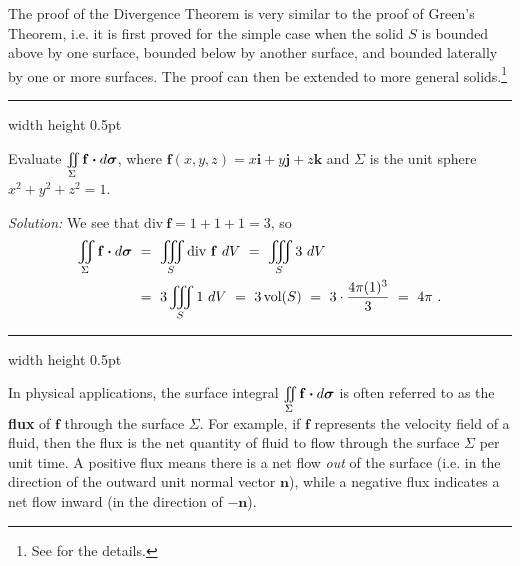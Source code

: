 
The proof of the Divergence Theorem is very similar to the proof of Green's Theorem, i.e. it is first proved for
the simple case when the solid $S$ is bounded above by one surface, bounded below by another surface, and bounded
laterally by one or more surfaces. The proof can then be extended to more general solids.\footnote{See
\cite[\S\,15.6]{tm} for the details.}

\medskip
\hrule width \textwidth height 0.5pt
\begin{exmp}
 Evaluate $\iint\limits_{\Sigma} \mathbf{f} \bm{\cdot} d\bm{\sigma}$, where $\mathbf{f}(x,y,z) = x\mathbf{i} +
  y\mathbf{j} + z\mathbf{k}$ and $\Sigma$ is the unit sphere $x^2 + y^2 + z^2 = 1$.\smallskip
 \par\noindent \emph{Solution:} We see that $\text{div}~\mathbf{f} = 1+1+1=3$, so
 \begin{align*}
  \iint\limits_{\Sigma} \mathbf{f} \bm{\cdot} d\bm{\sigma} ~&=~
  \iiint\limits_{S} \text{div}~\mathbf{f} ~dV
  ~=~ \iiint\limits_{S} 3 ~dV\\
  &=~ 3 \iiint\limits_{S} 1 ~dV
  ~=~ 3\,\text{vol}(S) ~=~ 3\cdot \frac{4\pi (1)^3}{3} ~=~ 4\pi ~.
 \end{align*}
\end{exmp}
\hrule width \textwidth height 0.5pt
\medskip

In physical applications, the surface integral $\iint\limits_{\Sigma} \mathbf{f} \bm{\cdot} d\bm{\sigma}$ is often
referred to as the \textbf{flux} of $\mathbf{f}$ through the surface $\Sigma$. For example, if $\mathbf{f}$
represents the velocity field of a fluid, then the flux
is the net quantity of fluid to flow through the surface $\Sigma$ per unit time. A
positive flux means there is a net flow \emph{out} of the surface (i.e. in the direction of the outward
unit normal vector $\mathbf{n}$), while a negative flux indicates a net flow inward (in the direction of
$-\mathbf{n}$).

